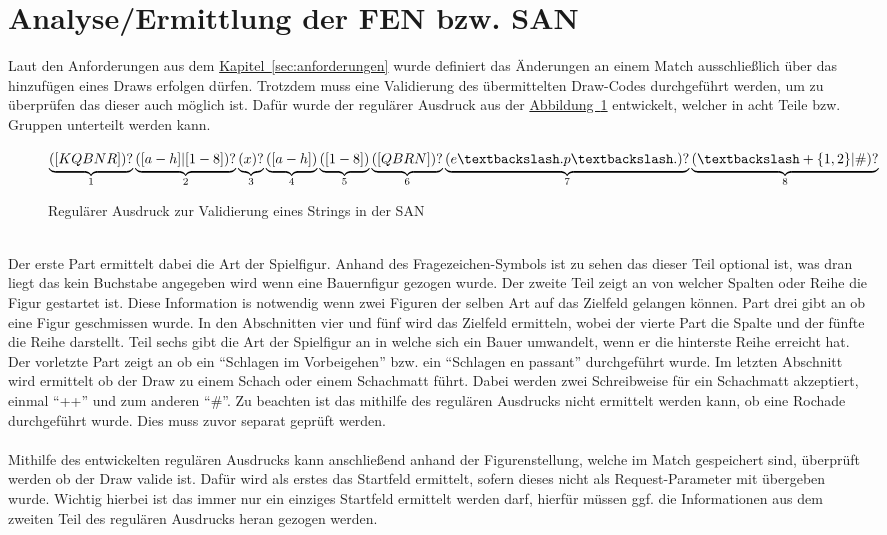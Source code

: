 \section{Analyse/Ermittlung der FEN bzw. SAN}
Laut den Anforderungen aus dem \hyperref[sec:anforderungen]{Kapitel~\ref{sec:anforderungen}} wurde definiert das Änderungen an einem Match ausschließlich über das hinzufügen eines Draws erfolgen dürfen. Trotzdem muss eine Validierung des übermittelten Draw-Codes durchgeführt werden, um zu überprüfen das dieser auch möglich ist. Dafür wurde der regulärer Ausdruck aus der \hyperref[fig:regexSAN]{Abbildung~\ref{fig:regexSAN}} entwickelt, welcher in acht Teile bzw. Gruppen unterteilt werden kann.\\
\begin{figure}
	$\underbrace{([KQBNR])?}_{1}\underbrace{([a-h]|[1-8])?}_{2}\underbrace{(x)?}_{3}\underbrace{([a-h])}_{4}\underbrace{([1-8])}_{5}\underbrace{([QBRN])?}_{6}\underbrace{(e\textbackslash.p\textbackslash.)?}_{7}\underbrace{(\textbackslash+\{1,2\}|\#)?}_{8}$
\caption{Regulärer Ausdruck zur Validierung eines Strings in der SAN}
\label{fig:regexSAN}
\end{figure}
\\
Der erste Part ermittelt dabei die Art der Spielfigur. Anhand des Fragezeichen-Symbols ist zu sehen  das dieser Teil optional ist, was dran liegt das kein Buchstabe angegeben wird wenn eine Bauernfigur gezogen wurde. Der zweite Teil zeigt an von welcher Spalten oder Reihe die Figur gestartet ist. Diese Information is notwendig wenn zwei Figuren der selben Art auf das Zielfeld gelangen können. Part drei gibt an ob eine Figur geschmissen wurde. In den Abschnitten vier und fünf wird das Zielfeld ermitteln, wobei der vierte Part die Spalte und der fünfte die Reihe darstellt. Teil sechs gibt die Art der Spielfigur an in welche sich ein Bauer umwandelt, wenn er die hinterste Reihe erreicht hat. Der vorletzte Part zeigt an ob ein \enquote{Schlagen im Vorbeigehen} bzw. ein \enquote{Schlagen en passant} durchgeführt wurde. Im letzten Abschnitt wird ermittelt ob der Draw zu einem Schach oder einem Schachmatt führt. Dabei werden zwei Schreibweise für ein Schachmatt akzeptiert, einmal \enquote{++} und zum anderen \enquote{\#}. Zu beachten ist das mithilfe des regulären Ausdrucks nicht ermittelt werden kann, ob eine Rochade durchgeführt wurde. Dies muss zuvor separat geprüft werden.\\
\\
Mithilfe des entwickelten regulären Ausdrucks kann anschließend anhand der Figurenstellung, welche im Match gespeichert sind, überprüft werden ob der Draw valide ist. Dafür wird als erstes das Startfeld ermittelt, sofern dieses nicht als Request-Parameter mit übergeben wurde. Wichtig hierbei ist das immer nur ein einziges Startfeld ermittelt werden darf, hierfür müssen ggf. die Informationen aus dem zweiten Teil des regulären Ausdrucks heran gezogen werden. \\
